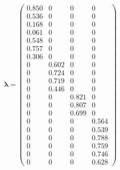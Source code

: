 \documentclass[11pt]{article}
\begin{document}
\begin{minipage}{0.35\linewidth}
  \begin{equation*}
    \pmb{\lambda} = 
      \begin{pmatrix}
      0.850           & 0	              & 0	                & 0           \\
      0.536	          & 0	              & 0	                & 0           \\
      0.168	          & 0	              & 0	                & 0           \\
      0.061	          & 0	              & 0	                & 0           \\
      0.548	          & 0	              & 0	                & 0           \\
      0.757	          & 0	              & 0	                & 0           \\
      0.306	          & 0	              & 0	                & 0           \\
      0	              & 0.602	          & 0	                & 0           \\
      0	              & 0.724	          & 0	                & 0           \\
      0	              & 0.719	          & 0	                & 0           \\
      0	              & 0.446	          & 0	                & 0           \\
      0	              & 0	              & 0.821	            & 0           \\
      0	              & 0	              & 0.807	            & 0           \\
      0	              & 0	              & 0.699	            & 0           \\
      0	              & 0	              & 0	                & 0.564       \\
      0	              & 0	              & 0	                & 0.539       \\
      0	              & 0	              & 0	                & 0.788       \\
      0	              & 0	              & 0	                & 0.759       \\
      0	              & 0	              & 0	                & 0.746       \\
      0	              & 0	              & 0	                & 0.628       
      \end{pmatrix}
  \end{equation*}
\end{minipage}
\end{document}
